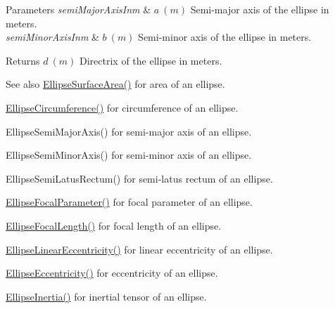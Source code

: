 \begin{DoxyParams}{Parameters}
{\em semi\+Major\+Axis\+Inm} & $ a\ (m)$ Semi-\/major axis of the ellipse in meters. \\
\hline
{\em semi\+Minor\+Axis\+Inm} & $ b\ (m)$ Semi-\/minor axis of the ellipse in meters. \\
\hline
\end{DoxyParams}
\begin{DoxyReturn}{Returns}
$ d\ (m)$ Directrix of the ellipse in meters. 
\end{DoxyReturn}
\begin{DoxySeeAlso}{See also}
\mbox{\hyperlink{group___e_g_x_math-_geometry-2_d-_ellipse-_surface_area_ga4ce8c8323e9718ce5458f4ab7f6d823d}{Ellipse\+Surface\+Area()}} for area of an ellipse. 

\mbox{\hyperlink{group___e_g_x_math-_geometry-2_d-_ellipse-_circumference_ga4172802ac674eb53467b44928ac635c7}{Ellipse\+Circumference()}} for circumference of an ellipse. 

Ellipse\+Semi\+Major\+Axis() for semi-\/major axis of an ellipse. 

Ellipse\+Semi\+Minor\+Axis() for semi-\/minor axis of an ellipse. 

Ellipse\+Semi\+Latus\+Rectum() for semi-\/latus rectum of an ellipse. 

\mbox{\hyperlink{group___e_g_x_math-_geometry-2_d-_ellipse-_focal_parameter_ga4cd01a38c72c092ef9791351948bf69b}{Ellipse\+Focal\+Parameter()}} for focal parameter of an ellipse. 

\mbox{\hyperlink{group___e_g_x_math-_geometry-2_d-_ellipse-_focal_length_gab8d63de7640c880cfecaeada6f2afdac}{Ellipse\+Focal\+Length()}} for focal length of an ellipse. 

\mbox{\hyperlink{group___e_g_x_math-_geometry-2_d-_ellipse-_linear_eccentricity_gac70b3010e30aa8b73deb50fe2b9b9a91}{Ellipse\+Linear\+Eccentricity()}} for linear eccentricity of an ellipse. 

\mbox{\hyperlink{group___e_g_x_math-_geometry-2_d-_ellipse-_eccentricity_ga6a0a7fba17f782616894cfc447628c33}{Ellipse\+Eccentricity()}} for eccentricity of an ellipse. 

\mbox{\hyperlink{group___e_g_x_math-_geometry-2_d-_ellipse-_inertia_ga10a3049c2f04b50f271fb01dc62e4cf8}{Ellipse\+Inertia()}} for inertial tensor of an ellipse. 
\end{DoxySeeAlso}
\mbox{\label{group___e_g_x_math-_geometry-2_d-_ellipse-_directrix_gaa496c6b5f9717e7ce731dd374f5d0ae8}} 
